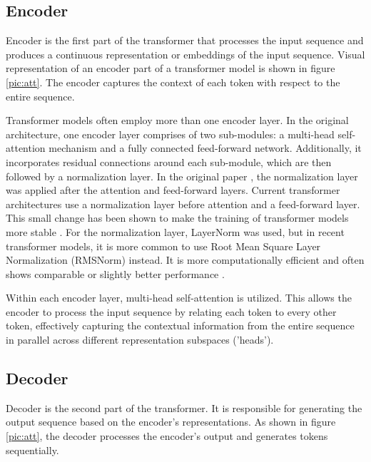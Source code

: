 \subsection{Encoder}
Encoder is the first part of the transformer that processes the input sequence and produces a continuous representation or embeddings of the input sequence. Visual representation of an encoder part of a transformer model is shown in figure \ref{pic:att}. The encoder captures the context of each token with respect to the entire sequence.

Transformer models often employ more than one encoder layer. In the original architecture, one encoder layer comprises of two sub-modules: a multi-head self-attention mechanism and a fully connected feed-forward network. Additionally, it incorporates residual connections around each sub-module, which are then followed by a normalization layer. In the original paper \cite{vaswani2017attention}, the normalization layer was applied after the attention and feed-forward layers. Current transformer architectures use a normalization layer before attention and a feed-forward layer. This small change has been shown to make the training of transformer models more stable \cite{xiong2020layernormalizationtransformerarchitecture}. For the normalization layer, LayerNorm was used, but in recent transformer models, it is more common to use  Root Mean Square Layer Normalization (RMSNorm) instead. It is more computationally efficient and often shows comparable or slightly better performance \cite{zhang2019rootmeansquarelayer}. 


Within each encoder layer, multi-head self-attention is utilized. This allows the encoder to process the input sequence by relating each token to every other token, effectively capturing the contextual information from the entire sequence in parallel across different representation subspaces ('heads').



\subsection{Decoder}
Decoder is the second part of the transformer. It is responsible for generating the output sequence based on the encoder's representations. As shown in figure \ref{pic:att}, the decoder processes the encoder's output and generates tokens sequentially.

